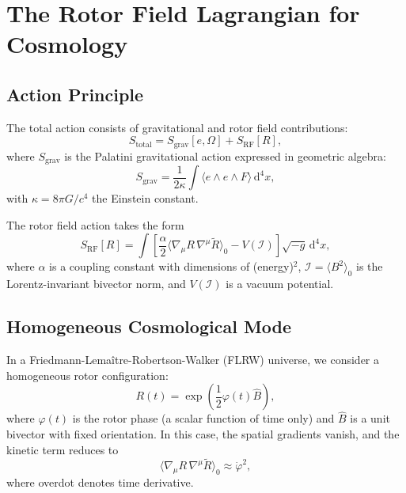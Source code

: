 \documentclass[11pt,a4paper]{article}
\numberwithin{equation}{section}
\theoremstyle{plain}
\theoremstyle{definition}
\theoremstyle{remark}
\newcommand{\dd}{\mathrm{d}}
\begin{document}
\section{The Rotor Field Lagrangian for Cosmology}
\label{sec:rflag}

\subsection{Action Principle}

The total action consists of gravitational and rotor field contributions:
\begin{equation}
S_{\mathrm{total}} = S_{\mathrm{grav}}[e,\Omega] + S_{\mathrm{RF}}[R],
\label{eq:total-action}
\end{equation}
where $S_{\mathrm{grav}}$ is the Palatini gravitational action expressed in geometric algebra:
\begin{equation}
S_{\mathrm{grav}} = \frac{1}{2\kappa} \int \langle e \wedge e \wedge F \rangle\, \dd^4x,
\end{equation}
with $\kappa = 8\pi G/c^4$ the Einstein constant.

The rotor field action takes the form
\begin{equation}
S_{\mathrm{RF}}[R] = \int \left[\frac{\alpha}{2}\langle \nabla_\mu R\,\nabla^\mu \widetilde{R} \rangle_0 - V(\mathcal{I})\right] \sqrt{-g}\, \dd^4x,
\label{eq:rf-action}
\end{equation}
where $\alpha$ is a coupling constant with dimensions of (energy)$^2$, $\mathcal{I} = \langle B^2 \rangle_0$ is the Lorentz-invariant bivector norm, and $V(\mathcal{I})$ is a vacuum potential.

\subsection{Homogeneous Cosmological Mode}

In a Friedmann-Lemaître-Robertson-Walker (FLRW) universe, we consider a homogeneous rotor configuration:
\begin{equation}
R(t) = \exp\left(\frac{1}{2}\varphi(t)\hat{B}\right),
\end{equation}
where $\varphi(t)$ is the rotor phase (a scalar function of time only) and $\hat{B}$ is a unit bivector with fixed orientation. In this case, the spatial gradients vanish, and the kinetic term reduces to
\begin{equation}
\langle \nabla_\mu R\,\nabla^\mu \widetilde{R} \rangle_0 \approx \dot{\varphi}^2,
\end{equation}
where overdot denotes time derivative.
\end{document}
